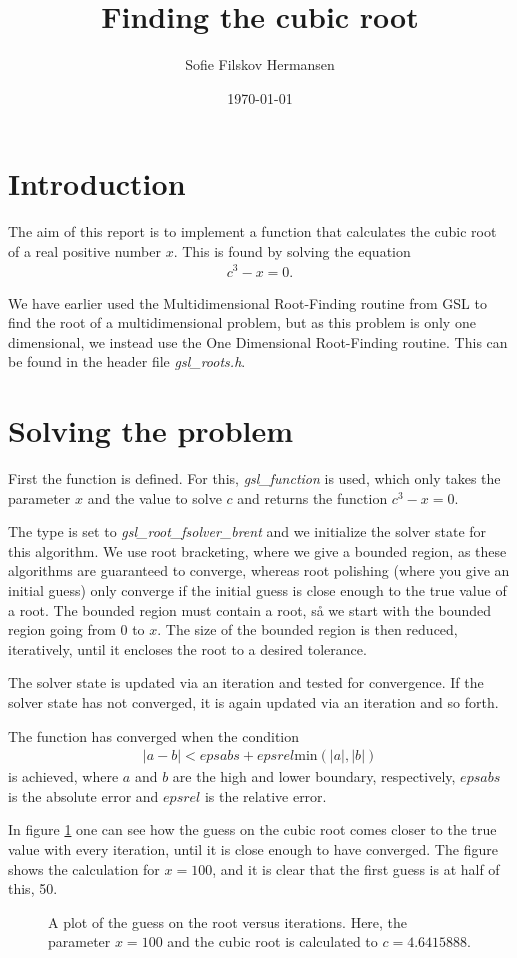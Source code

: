 \documentclass[a4paper]{article}
\title{Finding the cubic root}
\author{Sofie Filskov Hermansen}
\date{\today}
\begin{document}
\maketitle


\section{Introduction}
The aim of this report is to implement a function that calculates the cubic root of a real positive number $x$. This is found by solving the equation
\begin{align}
c^3-x = 0.
\end{align}

We have earlier used the Multidimensional Root-Finding routine from GSL to find the root of a multidimensional problem, but as this problem is only one dimensional, we instead use the One Dimensional Root-Finding routine. This can be found in the header file \textit{gsl\_roots.h}.

\section{Solving the problem}
First the function is defined. For this, \textit{gsl\_function} is used, which only takes the parameter $x$ and the value to solve $c$ and returns the function $c^3-x = 0$. 

The type is set to \textit{gsl\_root\_fsolver\_brent} and we initialize the solver state for this algorithm. We use root bracketing, where we give a bounded region, as these algorithms are guaranteed to converge, whereas root polishing (where you give an initial guess) only converge if the initial guess is close enough to the true value of a root.
The bounded region must contain a root, så we start with the bounded region going from $0$ to $x$. The size of the bounded region is then reduced, iteratively, until it encloses the root to a desired tolerance. 

The solver state is updated via an iteration and tested for convergence. If the solver state has not converged, it is again updated via an iteration and so forth.

The function has converged when the condition
\begin{align}
|a-b| < epsabs + epsrel \text{min}(|a|,|b|)
\end{align}
is achieved, where $a$ and $b$ are the high and lower boundary, respectively, $epsabs$ is the absolute error and $epsrel$ is the relative error.

In figure \ref{my_figure} one can see how the guess on the cubic root comes closer to the true value with every iteration, until it is close enough to have converged. The figure shows the calculation for $x = 100$, and it is clear that the first guess is at half of this, 50. 

\begin{figure}
	
	\caption{A plot of the guess on the root versus iterations. Here, the parameter $x = 100$ and the cubic root is calculated to $c = 4.6415888$.}
	\label{my_figure}
\end{figure}
\end{document}
